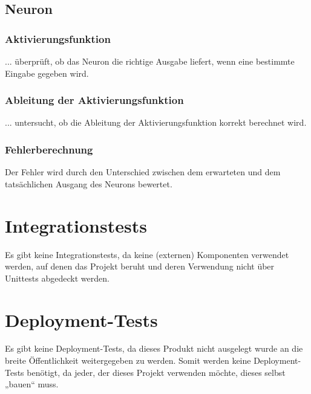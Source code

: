 \subsection{Neuron}
\label{sec:DesignNeuron}
\subsubsection{Aktivierungsfunktion}
\label{sec:DesignAktivierungsfunktion}
... überprüft, ob das Neuron die richtige Ausgabe liefert, wenn eine bestimmte Eingabe gegeben wird.
\subsubsection{Ableitung der Aktivierungsfunktion}
\label{sec:DesignAbleitungDerAktivierungsfunktion}
... untersucht, ob die Ableitung der Aktivierungsfunktion korrekt berechnet wird.
\subsubsection{Fehlerberechnung  }
\label{sec:DesignFehlerberechnung}
Der Fehler wird durch den Unterschied zwischen dem erwarteten und dem tatsächlichen Ausgang des Neurons bewertet.

\section{Integrationstests}
Es gibt keine Integrationstests, da keine (externen) Komponenten verwendet werden, auf denen das Projekt beruht und deren Verwendung nicht über Unittests abgedeckt werden.

\section{Deployment-Tests}
Es gibt keine Deployment-Tests, da dieses Produkt nicht ausgelegt wurde an die breite Öffentlichkeit weitergegeben zu werden.
Somit werden keine Deployment-Tests benötigt, da jeder, der dieses Projekt verwenden möchte, dieses selbst „bauen“ muss.